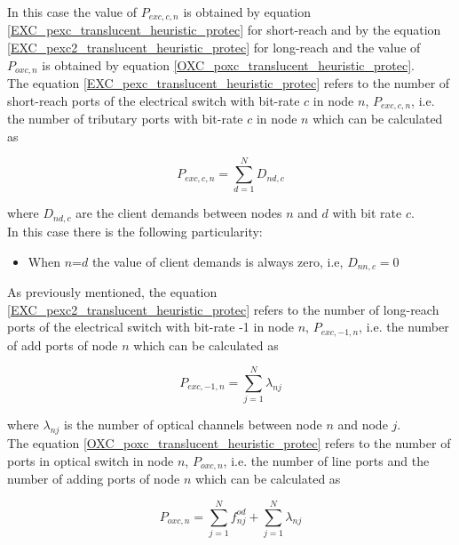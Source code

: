 In this case the value of $P_{exc,c,n}$ is obtained by equation \ref{EXC_pexc_translucent_heuristic_protec} for short-reach and by the equation \ref{EXC_pexc2_translucent_heuristic_protec} for long-reach and the value of $P_{oxc,n}$ is obtained by equation \ref{OXC_poxc_translucent_heuristic_protec}.\\

The equation \ref{EXC_pexc_translucent_heuristic_protec} refers to the number of short-reach ports of the electrical switch with bit-rate $c$ in node $n$, $P_{exc,c,n}$, i.e. the number of tributary ports with bit-rate $c$ in node $n$ which can be calculated as

\begin{equation}
P_{exc,c,n} = \sum_{d=1}^{N} D_{nd,c}
\label{EXC_pexc_translucent_heuristic_protec}
\end{equation}

\vspace{11pt}
\noindent
where $D_{nd,c}$ are the client demands between nodes $n$ and $d$ with bit rate $c$.\\

In this case there is the following particularity:
\begin{itemize}
  \item When $n$=$d$ the value of client demands is always zero, i.e, $D_{nn,c}=0$
\end{itemize}

\vspace{11pt}
As previously mentioned, the equation \ref{EXC_pexc2_translucent_heuristic_protec} refers to the number of long-reach ports of the electrical switch with bit-rate -1 in node $n$, $P_{exc,-1,n}$, i.e. the number of add ports of node $n$ which can be calculated as

\begin{equation}
P_{exc,-1,n} = \sum_{j=1}^{N} \lambda_{nj}
\label{EXC_pexc2_translucent_heuristic_protec}
\end{equation}

\vspace{11pt}
\noindent
where $\lambda_{nj}$ is the number of optical channels between node $n$ and node $j$.\\

The equation \ref{OXC_poxc_translucent_heuristic_protec} refers to the number of ports in optical switch in node $n$, $P_{oxc,n}$, i.e. the number of line ports and the number of adding ports of node $n$ which can be calculated as

\begin{equation}
P_{oxc,n} = \sum_{j=1}^{N} f_{nj}^{od} + \sum_{j=1}^{N} \lambda_{nj}
\label{OXC_poxc_translucent_heuristic_protec}
\end{equation}


